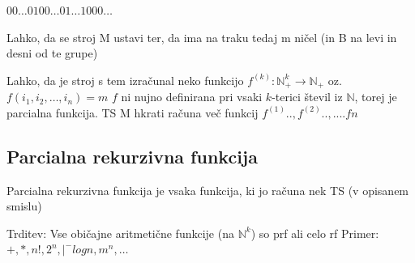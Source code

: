 \documentclass[10pt,a4paper,oneside]{book}
\begin{document}
\begin{primeri}
{    %
    $00\dots0100\dots01\dots1000\dots$
    
    Lahko, da se stroj M ustavi ter, da ima na traku tedaj m ničel (in B na levi in desni od te grupe)
    
    Lahko, da je stroj s tem izračunal neko funkcijo $f^{(k)}:\mathbb{N}^k_+ \rightarrow \mathbb{N}_+$ oz. $f(i_1, i_2, \dots, i_n) = m$
    $f$ ni nujno definirana pri vsaki $k$-terici števil iz $\mathbb{N}$, torej je parcialna funkcija. %
    TS M hkrati računa več funkcij $f^{(1)}.., f^{(2)}.., .... fn$
    
}
\end{primeri}    
\subsection{Parcialna rekurzivna funkcija}
Parcialna rekurzivna funkcija je vsaka funkcija, ki jo računa nek TS (v opisanem smislu)

Trditev: Vse običajne aritmetične funkcije (na $\mathbb{N}^k$) so prf ali celo rf
Primer: $+, *, n!, 2^n, |^- log n, m^n, \dots$
\end{document}
